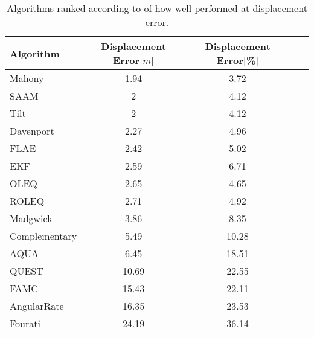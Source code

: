 \begin{table}[H]
    \begin{center}
        \begin{tabular}[t]{lcccc}
            \hline
            Algorithm     & Displacement Error[$m$] & Displacement Error[\%] \\
            \hline
            Mahony        & 1.94                    & 3.72                   \\
            SAAM          & 2                       & 4.12                   \\
            Tilt          & 2                       & 4.12                   \\
            Davenport     & 2.27                    & 4.96                   \\
            FLAE          & 2.42                    & 5.02                   \\
            EKF           & 2.59                    & 6.71                   \\
            OLEQ          & 2.65                    & 4.65                   \\
            ROLEQ         & 2.71                    & 4.92                   \\
            Madgwick      & 3.86                    & 8.35                   \\
            Complementary & 5.49                    & 10.28                  \\
            AQUA          & 6.45                    & 18.51                  \\
            QUEST         & 10.69                   & 22.55                  \\
            FAMC          & 15.43                   & 22.11                  \\
            AngularRate   & 16.35                   & 23.53                  \\
            Fourati       & 24.19                   & 36.14                  \\
        \end{tabular}
        \caption{ Algorithms ranked according to of how well performed at displacement error. }
        \label{tab:ranked_displacement}
    \end{center}
\end{table}